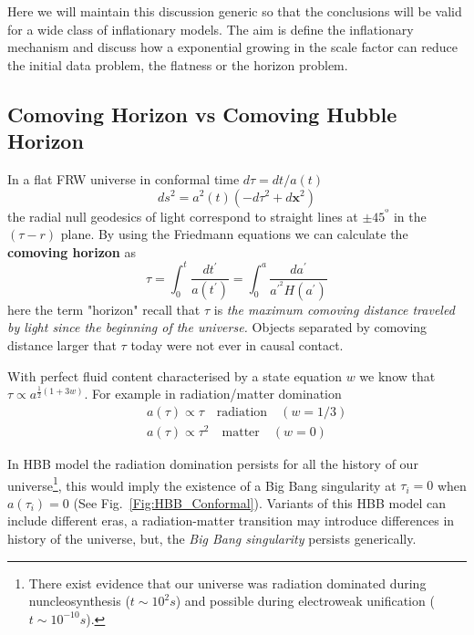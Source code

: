 \documentclass[12pt,letterpaper,twoside]{book}
\begin{document}
Here we will maintain this discussion generic so that the conclusions will be
valid for a wide class of inflationary models. The aim is define the
inflationary mechanism and discuss how a exponential growing in the scale factor
can reduce the initial data problem, the flatness or the horizon problem.





 \subsection{Comoving Horizon vs Comoving Hubble Horizon }



In a flat FRW universe in conformal time $d\tau = dt/a(t)$
 \begin{equation}
 ds^2= a^2(t) \left( -d\tau^2 + d\mathbf{x}^2 \right)
 \end{equation}
the radial null geodesics of light correspond to straight lines at $\pm 45^º$ in
the $(\tau - r)$ plane. By using the Friedmann equations we can calculate the
\textbf{comoving horizon} as
\begin{equation}
 \tau= \int_0^t  \frac{d t^\prime}{a(t^\prime) } =
       \int_0^a  \frac{d a^\prime}{a^{\prime^2} H \left( a^\prime\right)}
 \end{equation}
 here the term "horizon" recall that $\tau$ is \textit{the maximum comoving
     distance traveled by light since the beginning of the universe.}  Objects
 separated by comoving distance larger that $\tau$ today were not ever in causal
 contact.

With perfect fluid content characterised by a state equation $w$ we know that
$\tau \propto a^{\frac12 \left(1+3w\right)}$. For example in
radiation/matter domination
\begin{eqnarray}
&&a(\tau) \propto \tau \quad \mbox{radiation} \quad (w=1/3)\\
&&a(\tau) \propto \tau^2 \quad \mbox{matter} \quad (w=0)
\end{eqnarray}

In HBB model the radiation domination persists for all the history
of our universe\footnote{There exist evidence that our universe was radiation
    dominated during nuncleosynthesis ($t\sim 10^2 s$) and possible during
    electroweak unification ($t \sim 10^{-10}s$).}, this would imply the
existence of a Big Bang singularity at $\tau_i=0$ when $a(\tau_i)=0$ (See
Fig.~\ref{Fig:HBB_Conformal}). Variants of this HBB model can include different
eras, a radiation-matter transition may introduce differences in history of the
universe, but,  the \textit{Big Bang singularity} persists generically.
\end{document}
